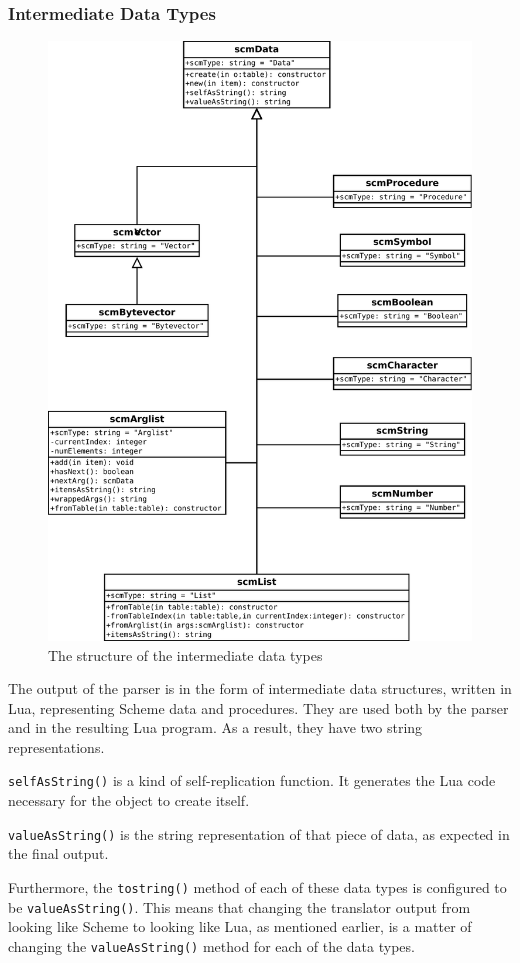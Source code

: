 \subsubsection{Intermediate Data Types}

\begin{figure}
\centering
\includegraphics[width=\textwidth]{scmDataUML.pdf}
\caption{The structure of the intermediate data types}
\label{fig:scmDataUML}
\end{figure}

The output of the parser is in the form of intermediate data structures, written
in Lua, representing Scheme data and procedures. They are used both by the
parser and in the resulting Lua program. As a result, they have two
string representations.
\begin{description}
\item \texttt{selfAsString()} is a kind of self-replication function. It
generates the Lua code necessary for the object to create itself.
\item \texttt{valueAsString()} is the string representation of that piece of
data, as expected in the final output.
\end{description}
Furthermore, the \texttt{tostring()} method of each of these data types is
configured to be \texttt{valueAsString()}. This means that changing the
translator output from looking like Scheme to looking like Lua, as mentioned
earlier, is a matter of changing the \texttt{valueAsString()} method for each of
the data types.

